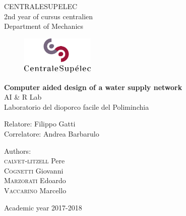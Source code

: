 \thispagestyle{empty}
\vspace*{-1.5cm} \bfseries{
\begin{center}
  \large
  CENTRALESUPELEC\\
  \normalsize
  2nd year of cursus centralien\\
  Department of Mechanics\\
  \begin{figure}[htbp]
    \begin{center}
    \includegraphics[width=3.5cm]{LogoCS.png}
    \end{center}
  \end{figure}
  \vspace*{0.3cm} \LARGE



  \textbf{Computer aided design of a water supply network}\\



  \vspace*{.75truecm} \large
  AI \& R Lab \\
  Laboratorio del dioporco facile del Poliminchia
\end{center}
\vspace*{3.0cm} \large
\begin{flushleft}


  Relatore: Filippo Gatti \\
  Correlatore: Andrea Barbarulo 

\end{flushleft}
\vspace*{1.0cm}
\begin{flushright}


  Authors: \\ 
  \textsc{calvet-litzell} Pere \\ \textsc{Cognetti} Giovanni \\ 
  \textsc{Marzorati} Edoardo \\ \textsc{Vaccarino} Marcello\\

\end{flushright}
\vspace*{0.5cm}
\begin{center}



  Academic year 2017-2018
\end{center} \clearpage
}
